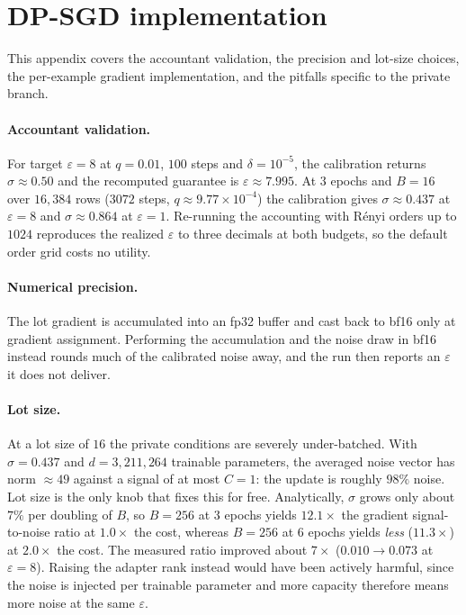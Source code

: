 \section{\label{apx:dpsgd}DP-SGD implementation}
This appendix covers the accountant validation,
the precision and lot-size choices,
the per-example gradient implementation,
and the pitfalls specific to the private branch.

\paragraph{Accountant validation.}
For target $\varepsilon = 8$ at $q = 0.01$,
$100$ steps and $\delta = 10^{-5}$,
the calibration returns $\sigma \approx 0.50$ and the recomputed guarantee is $\varepsilon \approx 7.995$.
At $3$ epochs and $B = 16$ over $16{,}384$ rows ($3072$ steps, $q \approx 9.77 \times 10^{-4}$) the calibration gives $\sigma \approx 0.437$ at $\varepsilon = 8$ and $\sigma \approx 0.864$ at $\varepsilon = 1$. Re-running the accounting with R\'enyi orders up to $1024$ reproduces the realized $\varepsilon$ to three decimals at both budgets,
so the default order grid costs no utility.

\paragraph{Numerical precision.}
The lot gradient is accumulated into an fp32 buffer and cast back to bf16 only at gradient assignment.
Performing the accumulation and the noise draw in bf16 instead rounds much of the calibrated noise away,
and the run then reports an $\varepsilon$ it does not deliver.

\paragraph{Lot size.}
At a lot size of $16$ the private conditions are severely under-batched.
With $\sigma = 0.437$ and $d = 3{,}211{,}264$ trainable parameters,
the averaged noise vector has norm $\approx 49$ against a signal of at most $C = 1$:
the update is roughly $98\%$ noise.
Lot size is the only knob that fixes this for free.
Analytically,
$\sigma$ grows only about $7\%$ per doubling of $B$,
so $B = 256$ at $3$ epochs yields $12.1\times$ the gradient signal-to-noise ratio at $1.0\times$ the cost,
whereas $B = 256$ at $6$ epochs yields \textit{less} ($11.3\times$) at $2.0\times$ the cost.
The measured ratio improved about $7\times$ ($0.010 \to 0.073$ at $\varepsilon = 8$).
Raising the adapter rank instead would have been actively harmful,
since the noise is injected per trainable parameter and more capacity therefore means more noise at the same $\varepsilon$.

